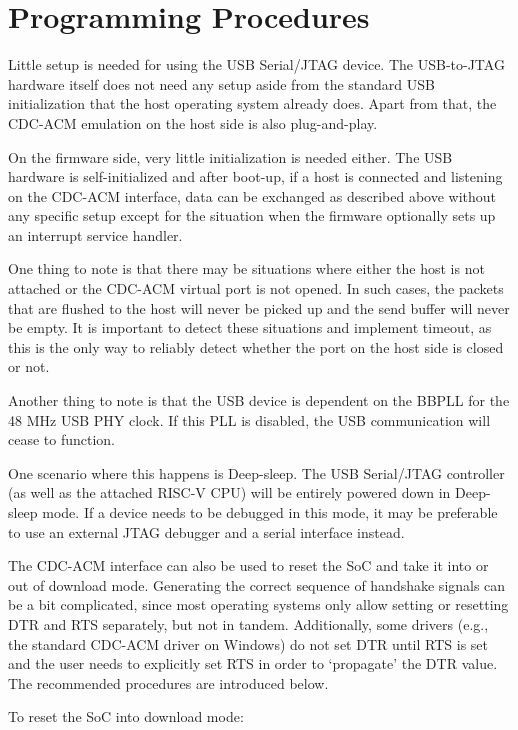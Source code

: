 \documentclass[main\_\_EN.tex]{subfiles}
\begin{document}
\section{Programming Procedures}
\label{sec:usbserialjtag-recommended-operation}

Little setup is needed for using the USB Serial/JTAG device. The USB-to-JTAG hardware itself does not need any setup aside from the standard USB initialization that the host operating system already does. Apart from that, the CDC-ACM emulation on the host side is also plug-and-play.

On the firmware side, very little initialization is needed either. The USB hardware is self-initialized and after boot-up, if a host is connected and listening on the CDC-ACM interface, data can be exchanged as described above without any specific setup except for the situation when the firmware optionally sets up an interrupt service handler.

One thing to note is that there may be situations where either the host is not attached or the CDC-ACM virtual port is not opened. In such cases, the packets that are flushed to the host will never be picked up and the send buffer will never be empty. It is important to detect these situations and implement timeout, as this is the only way to reliably detect whether the port on the host side is closed or not.

Another thing to note is that the USB device is dependent on the BBPLL for the 48 MHz USB PHY clock. If this PLL is disabled, the USB communication will cease to function.

One scenario where this happens is Deep-sleep. The USB Serial/JTAG controller (as well as the attached RISC-V CPU) will be entirely powered down in Deep-sleep mode. If a device needs to be debugged in this mode, it may be preferable to use an external JTAG debugger and a serial interface instead.

The CDC-ACM interface can also be used to reset the SoC and take it into or out of download mode. Generating the correct sequence of handshake signals can be a bit complicated, since most operating systems only allow setting or resetting DTR and RTS separately, but not in tandem. Additionally, some drivers (e.g., the standard CDC-ACM driver on Windows) do not set DTR until RTS is set and the user needs to explicitly set RTS in order to `propagate' the DTR value. The recommended procedures are introduced below.

To reset the SoC into download mode:
\end{document}
